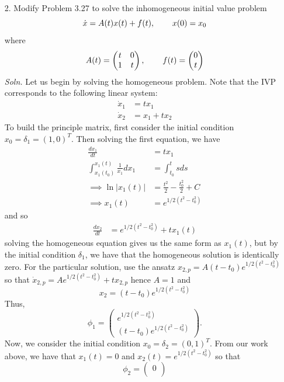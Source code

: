 \documentclass{article}
\begin{document}
\begin{itemize}
    \item[2.] Modify Problem 3.27 to solve the inhomogeneous initial value problem
\[\dot{x} = A(t)x(t) + f(t), \hspace{0.75cm} x(0) = x_0\]
where
\[A(t) = \begin{pmatrix}
    t & 0\\
    1 & t
\end{pmatrix}, \hspace{0.75cm} f(t) = \begin{pmatrix}
    0\\
    t
\end{pmatrix}\]
\textit{Soln.} Let us begin by solving the homogeneous problem. Note that the IVP corresponds to the following linear system:
\begin{align*}
    \dot{x}_1 &= tx_1\\
    \dot{x}_2 &= x_1 + tx_2
\end{align*}
To build the principle matrix, first consider the initial condition $x_0 = \delta_1 = (1,0)^T$. Then solving the first equation, we have
\begin{align*}
    \frac{dx_1}{dt} &= tx_1\\
    \int_{x_1(t_0)}^{x_1(t)}\frac{1}{x_1}dx_1 &= \int_{t_0}^t sds\\
    \implies \ln|x_1(t)| &= \frac{t^2}{2} - \frac{t_0^2}{2} + C\\
    \implies x_1(t) &= e^{1/2(t^2 - t_0^2)} \tag{$C = 0$ by I.C.}
\end{align*}
and so 
\begin{align*}
    \frac{dx_2}{dt} &= e^{1/2(t^2 - t_0^2)} + tx_1(t)
\end{align*}
solving the homogeneous equation gives us the same form as $x_1(t)$, but by the initial condition $\delta_1$, we have that the homogeneous solution is identically zero. For the particular solution, use the ansatz $x_{2,p} = A(t - t_0)e^{1/2(t^2 - t_0^2)}$ so that $\dot{x}_{2,p} = Ae^{1/2(t^2 - t_0^2)} + tx_{2,p}$ hence $A = 1$ and
\[x_2 = (t-t_0)e^{1/2(t^2 - t_0^2)}\]
Thus,
\[\phi_1 = \begin{pmatrix}
    e^{1/2(t^2 - t_0^2)}\\
    (t - t_0)e^{1/2(t^2 - t_0^2)}
\end{pmatrix}.\]
Now, we consider the initial condition $x_0 = \delta_2 = (0,1)^T$. From our work above, we have that $x_1(t) = 0$ and $x_2(t) = e^{1/2(t^2 - t_0^2)}$ so that
\[\phi_2 = \begin{pmatrix}
    0\\

\end{pmatrix}\]
\end{itemize}
\end{document}
